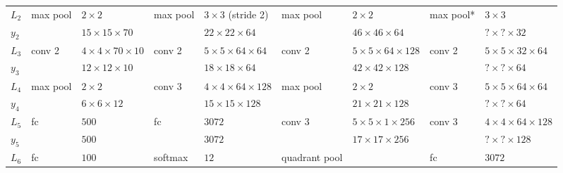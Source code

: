 \begin{landscape}
\begin{table}[h!]
{\begin{tabular}{|lllllllll|}
\multicolumn{1}{|l|}{$L_2$}   & max pool & \multicolumn{1}{l|}{$2\times 2$}                   & max pool & \multicolumn{1}{l|}{$3\times3$ (stride 2)}           & max pool      & \multicolumn{1}{l|}{$2\times2$}                  & max pool*  & $3\times3$                    \\
\multicolumn{1}{|l|}{$y_2$}   &          & \multicolumn{1}{l|}{$15\times15\times 70$}         &          & \multicolumn{1}{l|}{$22\times 22\times64$}           &               & \multicolumn{1}{l|}{$46\times46\times64$}        &           & $?\times?\times32$             \\ \hline
\multicolumn{1}{|l|}{$L_3$}   & conv 2   & \multicolumn{1}{l|}{$4\times 4\times70\times 10$}  & conv 2   & \multicolumn{1}{l|}{$5 \times 5 \times 64\times64$}  & conv 2        & \multicolumn{1}{l|}{$5\times5\times64\times128$} & conv 2    & $5\times5\times32\times64$     \\
\multicolumn{1}{|l|}{$y_3$}   &          & \multicolumn{1}{l|}{$12\times 12 \times 10$}       &          & \multicolumn{1}{l|}{$18 \times 18\times64$}          &               & \multicolumn{1}{l|}{$42\times42\times128$}       &           & $?\times?\times64$             \\ \hline
\multicolumn{1}{|l|}{$L_4$}   & max pool & \multicolumn{1}{l|}{$2\times 2$}                   & conv 3   & \multicolumn{1}{l|}{$4\times 4 \times64 \times 128$} & max pool      & \multicolumn{1}{l|}{$2\times2$}                  & conv 3    & $5\times5\times64\times64$     \\
\multicolumn{1}{|l|}{$y_4$}   &          & \multicolumn{1}{l|}{$6\times 6 \times 12$}         &          & \multicolumn{1}{l|}{$15\times15\times128$}           &               & \multicolumn{1}{l|}{$21\times21\times128$}       &           & $?\times?\times64$             \\ \hline
\multicolumn{1}{|l|}{$L_5$}   & fc       & \multicolumn{1}{l|}{$500$}                         & fc       & \multicolumn{1}{l|}{$3072$}                          & conv 3        & \multicolumn{1}{l|}{$5\times5\times1\times256$}  & conv 3    & $4\times4\times64\times128$    \\
\multicolumn{1}{|l|}{$y_5$}   &          & \multicolumn{1}{l|}{$500$}                         &          & \multicolumn{1}{l|}{$3072$}                          &               & \multicolumn{1}{l|}{$17\times17\times256$}       &           & $?\times?\times128$            \\ \hline
\multicolumn{1}{|l|}{$L_6$}   & fc       & \multicolumn{1}{l|}{$100$}                         & softmax  & \multicolumn{1}{l|}{$12$}                            & quadrant pool & \multicolumn{1}{l|}{}                            & fc        & $3072$                         \\

\end{tabular}}
\end{table}
\end{landscape}
